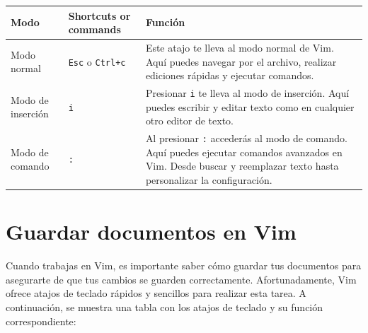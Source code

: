 \documentclass[
  doc,
  floatsintext,
  longtable,
  a4paper,
  nolmodern,
  notxfonts,
  notimes,
  12pt,
  colorlinks=true,linkcolor=blue,citecolor=blue,urlcolor=blue]{apa7}
\newcounter{none} %
\begin{document}
{\def\LTcaptype{none} %
\begin{longtable}[]{@{}
  >{\raggedright\arraybackslash}p{}
  >{\raggedright\arraybackslash}p{}
  >{\raggedright\arraybackslash}p{}@{}}
\toprule\noalign{}
\begin{minipage}[b]{\linewidth}\raggedright
Modo
\end{minipage} & \begin{minipage}[b]{\linewidth}\raggedright
Shortcuts or commands
\end{minipage} & \begin{minipage}[b]{\linewidth}\raggedright
Función
\end{minipage} \\
\midrule\noalign{}
\endhead
\bottomrule\noalign{}
\endlastfoot
Modo normal & \texttt{Esc} o \texttt{Ctrl+c} & Este atajo te lleva al
modo normal de Vim. Aquí puedes navegar por el archivo, realizar
ediciones rápidas y ejecutar comandos. \\
Modo de inserción & \texttt{i} & Presionar \texttt{i} te lleva al modo
de inserción. Aquí puedes escribir y editar texto como en cualquier otro
editor de texto. \\
Modo de comando & \texttt{:} & Al presionar \texttt{:} accederás al modo
de comando. Aquí puedes ejecutar comandos avanzados en Vim. Desde buscar
y reemplazar texto hasta personalizar la configuración. \\
\end{longtable}
}

\section{Guardar documentos en Vim}\label{guardar-documentos-en-vim}

Cuando trabajas en Vim, es importante saber cómo guardar tus documentos
para asegurarte de que tus cambios se guarden correctamente.
Afortunadamente, Vim ofrece atajos de teclado rápidos y sencillos para
realizar esta tarea. A continuación, se muestra una tabla con los atajos
de teclado y su función correspondiente:
\end{document}
